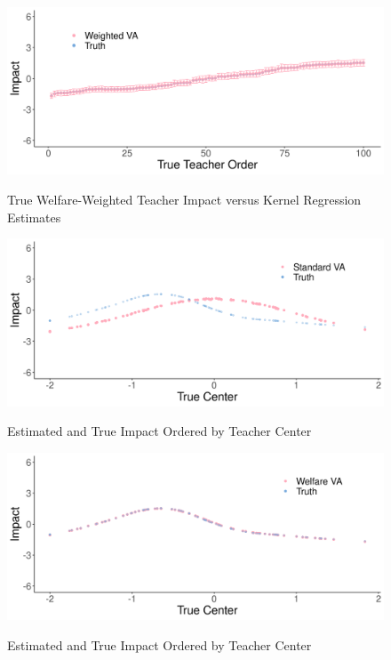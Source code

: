 \documentclass[letterpaper,12pt]{article}
\begin{document}
\begin{figure}[ht]
    \centering
    \caption{True Welfare-Weighted Teacher Impact versus Kernel Regression Estimates}
    \includegraphics[width=.9\textwidth]{slides/CIERS_Figures/ww_cat_run_2.png}
    \label{fig:alt_cat}
\end{figure}

\begin{figure}[ht]
    \centering
    \caption{Estimated and True Impact Ordered by Teacher Center}
    \includegraphics[width=.9\textwidth]{slides/CIERS_Figures/standard_cent_run_2.png}
    \label{fig:stand_cent}
\end{figure}

\begin{figure}[ht]
    \centering
    \caption{Estimated and True Impact Ordered by Teacher Center}
    \includegraphics[width=.9\textwidth]{slides/CIERS_Figures/welfare_cent_run_2.png}
    \label{fig:alt_cent}
\end{figure}
\end{document}

